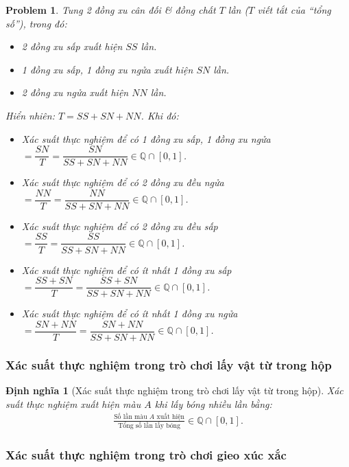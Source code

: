 \documentclass{article}
\numberwithin{equation}{section}
\newtheorem{dinhnghia}{Định nghĩa}[section]
\newtheorem{problem}{Problem}[section]
\begin{document}
\begin{problem}
	Tung 2 đồng xu cân đối \textit{\&} đồng chất $T$ lần ($T$ viết tắt của ``tổng số''), trong đó:
	\begin{itemize}
		\item 2 đồng xu sấp xuất hiện $SS$ lần.
		\item 1 đồng xu sấp, 1 đồng xu ngửa xuất hiện $SN$ lần.
		\item 2 đồng xu ngửa xuất hiện $NN$ lần.
	\end{itemize}
	Hiển nhiên: $T = SS + SN + NN$. Khi đó:
	\begin{itemize}
		\item Xác suất thực nghiệm để có 1 đồng xu sấp, 1 đồng xu ngửa $= \dfrac{SN}{T} = \dfrac{SN}{SS + SN + NN}\in\mathbb{Q}\cap[0,1]$.
		\item Xác suất thực nghiệm để có 2 đồng xu đều ngửa $= \dfrac{NN}{T} = \dfrac{NN}{SS + SN + NN}\in\mathbb{Q}\cap[0,1]$.
		\item Xác suất thực nghiệm để có 2 đồng xu đều sấp $= \dfrac{SS}{T} = \dfrac{SS}{SS + SN + NN}\in\mathbb{Q}\cap[0,1]$.
		\item Xác suất thực nghiệm để có ít nhất 1 đồng xu sấp $= \dfrac{SS + SN}{T} = \dfrac{SS + SN}{SS + SN + NN}\in\mathbb{Q}\cap[0,1]$.
		\item Xác suất thực nghiệm để có ít nhất 1 đồng xu ngửa $= \dfrac{SN + NN}{T} = \dfrac{SN + NN}{SS + SN + NN}\in\mathbb{Q}\cap[0,1]$.
	\end{itemize}
\end{problem}

\subsubsection{Xác suất thực nghiệm trong trò chơi lấy vật từ trong hộp}

\begin{dinhnghia}[Xác suất thực nghiệm trong trò chơi lấy vật từ trong hộp]
	\emph{Xác suất thực nghiệm xuất hiện màu $A$} khi lấy bóng nhiều lần bằng:
	\begin{align*}
		\frac{\mbox{Số lần màu $A$ xuất hiện}}{\mbox{Tổng số lần lấy bóng}}\in\mathbb{Q}\cap[0,1].
	\end{align*}
\end{dinhnghia}

\subsubsection{Xác suất thực nghiệm trong trò chơi gieo xúc xắc}
\end{document}
